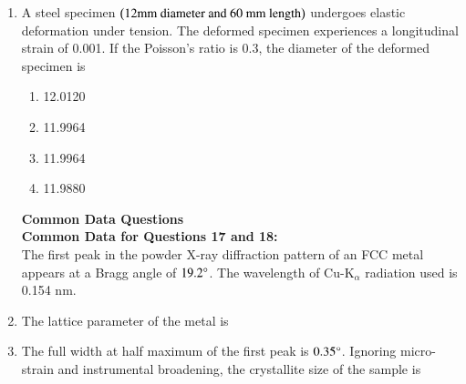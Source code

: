 \documentclass[journal]{IEEEtran}
\begin{document}
\begin{enumerate}
\item A steel specimen $\left(12 \text{mm diameter and}\ 60 \ \text{mm length}\right)$ undergoes elastic deformation under tension. The deformed specimen experiences a longitudinal strain of 0.001. If the Poisson's ratio is 0.3, the diameter of the deformed specimen  is 
\begin{multicols}{4}
\begin{enumerate}
    \item 12.0120
    \item 11.9964
    \item 11.9964
    \item 11.9880
\end{enumerate}
\end{multicols}

\textbf{Common Data Questions}\\

\textbf{Common Data for Questions 17 and 18:}\\
 The first peak in the powder X-ray diffraction pattern of an FCC metal appears at a Bragg angle of $19.2\degree$. The wavelength of Cu-K$_{\alpha}$ radiation used is 0.154 nm.\\
\item The lattice parameter of the metal  is
\begin{enumerate}
\end{enumerate}


\item The full width at half maximum  of the first peak is $0.35\degree$.
 Ignoring micro-strain and instrumental broadening, the crystallite size of the sample  is 
\begin{enumerate}
\end{enumerate}


\end{enumerate}
\end{document}
